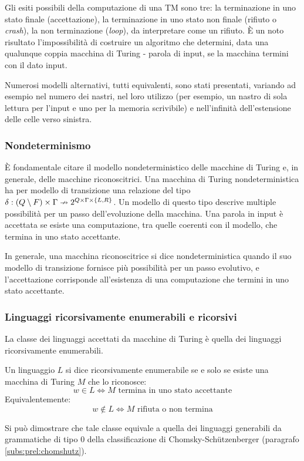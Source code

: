 Gli esiti possibili della computazione di una TM sono tre: la terminazione in uno stato finale (accettazione), la terminazione in uno stato non finale (rifiuto o \emph{crash}), la non terminazione (\emph{loop}), da interpretare come un rifiuto. È un noto risultato l'impossibilità di costruire un algoritmo che determini, data una qualunque coppia macchina di Turing - parola di input, se la macchina termini con il dato input.

Numerosi modelli alternativi, tutti equivalenti, sono stati presentati, variando ad esempio nel numero dei nastri, nel loro utilizzo (per esempio, un nastro di sola lettura per l'input e uno per la memoria scrivibile) e nell'infinità dell'estensione delle celle verso sinistra.

\subsubsection{Nondeterminismo}
È fondamentale citare il modello nondeterministico delle macchine di Turing e, in generale, delle macchine riconoscitrici. Una macchina di Turing nondeterministica ha per modello di transizione una relazione del tipo $\delta:(Q\setminus F)\times\Gamma\nrightarrow 2^{Q\times\Gamma\times\left\{ L,R \right\}}$. Un modello di questo tipo descrive multiple possibilità per un passo dell'evoluzione della macchina. Una parola in input è accettata se esiste una computazione, tra quelle coerenti con il modello, che termina in uno stato accettante.

In generale, una macchina riconoscitrice si dice nondeterministica quando il suo modello di transizione fornisce più possibilità per un passo evolutivo, e l'accettazione corrisponde all'esistenza di una computazione che termini in uno stato accettante.

\subsubsection{Linguaggi ricorsivamente enumerabili e ricorsivi}
La classe dei linguaggi accettati da macchine di Turing è quella dei linguaggi ricorsivamente enumerabili.
\begin{defin}
	Un linguaggio $L$ si dice ricorsivamente enumerabile se e solo se esiste una macchina di Turing $M$ che lo riconosce:
	\begin{equation*}
		w\in L \iff M \text{ termina in uno stato accettante}
	\end{equation*}
	Equivalentemente:
	\begin{equation*}
		w\notin L \iff M \text{ rifiuta o non termina}
	\end{equation*}
\end{defin}
Si può dimostrare che tale classe equivale a quella dei linguaggi generabili da grammatiche di tipo 0 della classificazione di Chomsky-Schützenberger (paragrafo \ref{subs:prel:chomshutz}).

